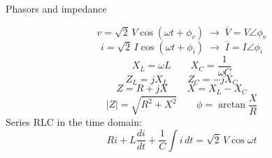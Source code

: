 Phasors and impedance

$$v=\sqrt{2}\,V\cos(\omega t+\phi_v)\;\to\;\bar V=V\angle\phi_v$$
$$i=\sqrt{2}\,I\cos(\omega t+\phi_i)\;\to\;\bar I=I\angle\phi_i$$
$$X_L=\omega L\qquad X_C=\frac{1}{\omega C}$$
$$Z_L=jX_L\qquad Z_C=-jX_C$$
$$Z=R+jX\qquad X=X_L-X_C$$
$$\left|Z\right|=\sqrt{R^2+X^2}\qquad \phi=\arctan\frac{X}{R}$$
Series RLC in the time domain:
$$Ri+L\frac{di}{dt}+\frac{1}{C}\int i\,dt=\sqrt{2}\,V\cos\omega t$$
